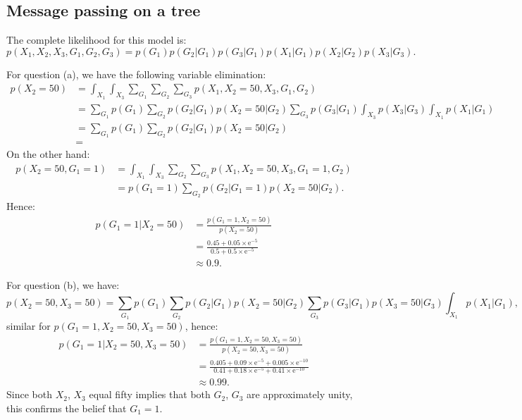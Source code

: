\documentclass[UTF8]{ctexart}
\begin{document}
\subsection{Message passing on a tree}
The complete likelihood for this model is:
$$p(X_{1},X_{2},X_{3},G_{1},G_{2},G_{3})=p(G_{1})p(G_{2}|G_{1})p(G_{3}|G_{1})p(X_{1}|G_{1})p(X_{2}|G_{2})p(X_{3}|G_{3}).$$

For question (a), we have the following variable elimination:
$$
\begin{aligned}
p(X_{2}=50)&=\int_{X_{1}}\int_{X_{3}}\sum_{G_{1}}\sum_{G_{2}}\sum_{G_{3}}p(X_{1},X_{2}=50,X_{3},G_{1},G_{2})\\
&=\sum_{G_{1}}p(G_{1})\sum_{G_{2}}p(G_{2}|G_{1})p(X_{2}=50|G_{2})\sum_{G_{3}}p(G_{3}|G_{1})\int_{X_{3}}p(X_{3}|G_{3})\int_{X_{1}}p(X_{1}|G_{1})\\
&=\sum_{G_{1}}p(G_{1})\sum_{G_{2}}p(G_{2}|G_{1})p(X_{2}=50|G_{2})\\
&=
\end{aligned}
$$
On the other hand:
$$
\begin{aligned}
p(X_{2}=50,G_{1}=1)&=\int_{X_{1}}\int_{X_{3}}\sum_{G_{2}}\sum_{G_{3}}p(X_{1},X_{2}=50,X_{3},G_{1}=1,G_{2})\\
&=p(G_{1}=1)\sum_{G_{2}}p(G_{2}|G_{1}=1)p(X_{2}=50|G_{2}).
\end{aligned}
$$
Hence:
$$
\begin{aligned}
p(G_{1}=1|X_{2}=50)&=\frac{p(G_{1}=1,X_{2}=50)}{p(X_{2}=50)}\\
&=\frac{0.45+0.05\times \text{e}^{-5}}{0.5+0.5\times \text{e}^{-5}}\\
&\approx 0.9.
\end{aligned}
$$

For question (b), we have:
$$
p(X_{2}=50,X_{3}=50)=\sum_{G_{1}}p(G_{1})\sum_{G_{2}}p(G_{2}|G_{1})p(X_{2}=50|G_{2})\sum_{G_{3}}p(G_{3}|G_{1})p(X_{3}=50|G_{3})\int_{X_{1}}p(X_{1}|G_{1}),
$$
similar for $p(G_{1}=1,X_{2}=50,X_{3}=50)$, hence:
$$
\begin{aligned}
p(G_{1}=1|X_{2}=50,X_{3}=50)&=\frac{p(G_{1}=1,X_{2}=50,X_{3}=50)}{p(X_{2}=50,X_{3}=50)}\\
&=\frac{0.405+0.09\times \text{e}^{-5}+0.005\times\text{e}^{-10}}{0.41+0.18\times \text{e}^{-5}+0.41\times\text{e}^{-10}}\\
&\approx 0.99.
\end{aligned}
$$
Since both $X_{2}$, $X_{3}$ equal fifty implies that both $G_{2}$, $G_{3}$ are approximately unity, this confirms the belief that $G_{1}=1$.
\end{document}
